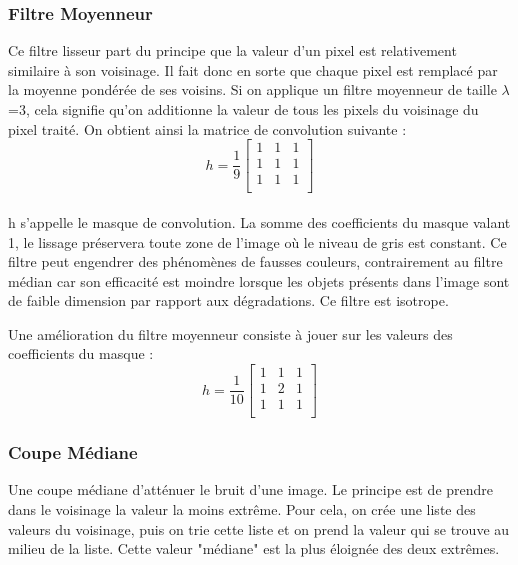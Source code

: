 \subsubsection*{Filtre Moyenneur}

Ce filtre lisseur part du principe que la valeur d'un pixel est relativement similaire à son voisinage. Il fait donc en sorte que chaque pixel est remplacé par la moyenne pondérée de ses voisins. Si on applique un filtre moyenneur de taille $\lambda$=3, cela signifie qu'on additionne la valeur de tous les pixels du voisinage du pixel traité. On obtient ainsi la matrice de convolution suivante :
$$h = \frac{1}{9}
\begin{bmatrix}
	1 & 1 & 1 \\
	1 & 1 & 1 \\
	1 & 1 & 1 \\
\end{bmatrix}  $$

\paragraph{}
h s’appelle le masque de convolution. La somme des coefficients du masque valant 1, le lissage préservera toute zone de l’image où le niveau de gris est constant. Ce filtre peut engendrer des phénomènes de fausses couleurs, contrairement au filtre médian car son efficacité est moindre lorsque les objets présents dans l'image sont de faible dimension par rapport aux dégradations. Ce filtre est isotrope. 

Une amélioration du filtre moyenneur consiste à jouer sur les valeurs des coefficients du masque :
$$h = \frac{1}{10}
\begin{bmatrix}
	1 & 1 & 1 \\
	1 & 2 & 1 \\
	1 & 1 & 1 \\
\end{bmatrix}  $$

\subsubsection*{Coupe Médiane}

Une coupe médiane d’atténuer le bruit d’une image. Le principe est de prendre dans le voisinage la valeur la moins extrême. Pour cela, on crée une liste des valeurs du voisinage, puis on trie cette liste et on prend la valeur qui se trouve au milieu de la liste. Cette valeur "médiane" est la plus éloignée des deux extrêmes.

